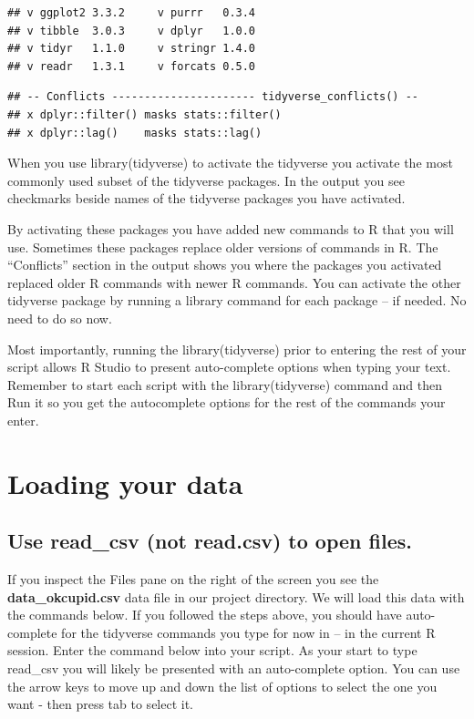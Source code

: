 \documentclass[
]{krantz}
\begin{document}
\begin{verbatim}
## v ggplot2 3.3.2     v purrr   0.3.4
## v tibble  3.0.3     v dplyr   1.0.0
## v tidyr   1.1.0     v stringr 1.4.0
## v readr   1.3.1     v forcats 0.5.0
\end{verbatim}

\begin{verbatim}
## -- Conflicts ---------------------- tidyverse_conflicts() --
## x dplyr::filter() masks stats::filter()
## x dplyr::lag()    masks stats::lag()
\end{verbatim}

When you use library(tidyverse) to activate the tidyverse you activate the most commonly used subset of the tidyverse packages. In the output you see checkmarks beside names of the tidyverse packages you have activated.

By activating these packages you have added new commands to R that you will use. Sometimes these packages replace older versions of commands in R. The ``Conflicts'' section in the output shows you where the packages you activated replaced older R commands with newer R commands. You can activate the other tidyverse package by running a library command for each package -- if needed. No need to do so now.

Most importantly, running the library(tidyverse) prior to entering the rest of your script allows R Studio to present auto-complete options when typing your text. Remember to start each script with the library(tidyverse) command and then Run it so you get the autocomplete options for the rest of the commands your enter.

\hypertarget{loading-your-data}{%
\section{Loading your data}\label{loading-your-data}}

\hypertarget{use-read_csv-not-read.csv-to-open-files.}{%
\subsection{Use read\_csv (not read.csv) to open files.}\label{use-read_csv-not-read.csv-to-open-files.}}

If you inspect the Files pane on the right of the screen you see the \textbf{data\_okcupid.csv} data file in our project directory. We will load this data with the commands below. If you followed the steps above, you should have auto-complete for the tidyverse commands you type for now in -- in the current R session. Enter the command below into your script. As your start to type read\_csv you will likely be presented with an auto-complete option. You can use the arrow keys to move up and down the list of options to select the one you want - then press tab to select it.
\end{document}
